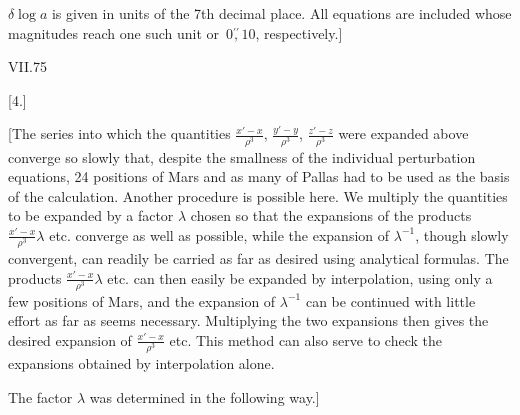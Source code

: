 \par\noindent\hspace*{\parindent}\(\delta\log a\) is given in units of the 7th decimal place. All equations are included whose magnitudes
reach one such unit or\ \(0\overset{\prime\prime}{,}10\), respectively.]
\par\smallskip\noindent VII.\hfill 75\par
\par\endgroup

\par\medskip
{}
\begin{center}[4.]\end{center}
\begingroup
\small
\par\noindent\hspace*{\parindent}[The series into which the quantities \(\frac{x'-x}{\rho^3}\), \(\frac{y'-y}{\rho^3}\), \(\frac{z'-z}{\rho^3}\) were expanded above
converge so slowly that, despite the smallness of the individual perturbation equations, 24 positions of Mars
and as many of Pallas had to be used as the basis of the calculation. Another procedure is possible here.
We multiply the quantities to be expanded by a factor \(\lambda\)
chosen so that the expansions of the products \(\frac{x'-x}{\rho^3}\lambda\) etc. converge as well as possible,
while the expansion of \(\lambda^{-1}\), though slowly convergent, can readily be carried as far as desired using analytical
formulas. The products \(\frac{x'-x}{\rho^3}\lambda\) etc. can then easily be expanded by interpolation,
using only a few positions of Mars, and the expansion of \(\lambda^{-1}\) can be continued with
little effort as far as seems necessary. Multiplying the two expansions then gives
the desired expansion of \(\frac{x'-x}{\rho^3}\) etc. This method can also serve to check the expansions obtained
by interpolation alone.
\par\noindent\hspace*{\parindent}The factor \(\lambda\) was determined in the following way.]
\par\endgroup
\clearpage
\endgroup
